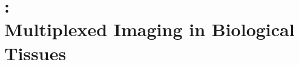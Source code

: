 









\section[\glsentryshort{imc}: Multiplexed Imaging in Biological Tissues]{:\\Multiplexed Imaging in Biological Tissues}  %
\label{sec:int_IMC}

